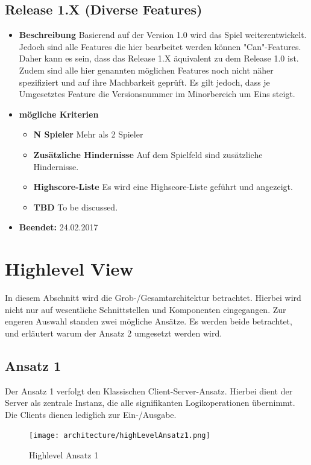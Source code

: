 \subsection{Release 1.X (Diverse Features)}
\begin{itemize}
	\item \textbf{Beschreibung}\newline
	Basierend auf der Version 1.0 wird das Spiel weiterentwickelt. Jedoch sind alle Features die hier bearbeitet werden können "Can"-Features. Daher kann es sein, dass das Release 1.X äquivalent zu dem Release 1.0 ist. Zudem sind alle hier genannten möglichen Features noch nicht näher spezifiziert und auf ihre Machbarkeit geprüft. Es gilt jedoch, dass je Umgesetztes Feature die Versionsnummer im Minorbereich um Eins steigt.
	\item \textbf{mögliche Kriterien}
	\begin{itemize}
		\item \textbf{N Spieler} \newline
		Mehr als 2 Spieler
		\item \textbf{Zusätzliche Hindernisse} \newline
		Auf dem Spielfeld sind zusätzliche Hindernisse.
		\item \textbf{Highscore-Liste} \newline
		Es wird eine Highscore-Liste geführt und angezeigt.
		\item \textbf{TBD} \newline
		To be discussed.
	\end{itemize}
	\item \textbf{Beendet:} 24.02.2017
\end{itemize}

\section{Highlevel View}
In diesem Abschnitt wird die Grob-/Gesamtarchitektur betrachtet. Hierbei wird nicht nur auf wesentliche Schnittstellen und Komponenten eingegangen. Zur engeren Auswahl standen zwei mögliche Ansätze. Es werden beide betrachtet, und erläutert warum der Ansatz 2 umgesetzt werden wird.
\subsection{Ansatz 1}
Der Ansatz 1 verfolgt den Klassischen Client-Server-Ansatz. Hierbei dient der Server als zentrale Instanz, die alle signifikanten Logikoperationen übernimmt. Die Clients dienen lediglich zur Ein-/Ausgabe.
\begin{figure}[ht]
	\centering
	\texttt{[image: architecture/highLevelAnsatz1.png]}
	\caption{Highlevel Ansatz 1}
	\label{fig1}
\end{figure}
